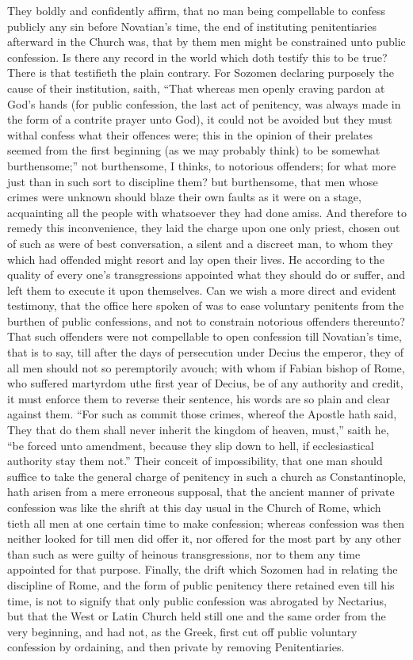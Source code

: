They boldly and confidently affirm, that no man being compellable to confess publicly any sin before Novatian’s time, the end of instituting penitentiaries afterward in the Church was, that by them men might be constrained unto public confession. Is there any record in the world which doth testify this to be true? There is that testifieth the plain contrary. For Sozomen  declaring purposely the cause of their institution, saith, “That whereas men openly craving pardon at God’s hands (for public confession, the last act of penitency, was always made in the form of a contrite prayer unto God), it could not be avoided but they must withal confess what their offences were; this in the opinion of their prelates seemed from the first beginning (as we may probably think) to be somewhat burthensome;” not burthensome, I thinks, to notorious offenders; for what more just than in such sort to discipline them? but burthensome, that men whose crimes were unknown should blaze their own faults as it were on a stage, acquainting all the people with whatsoever they had done amiss. And therefore to remedy this inconvenience, they laid the charge upon one only priest, chosen out of such as were of best conversation, a silent and a discreet man, to whom they which had offended might resort and lay open their lives. He according to the quality of every one’s transgressions appointed what they should do or suffer, and left them to execute it upon themselves. Can we wish a more direct and evident testimony, that the office here spoken of was to ease voluntary penitents from the burthen of public confessions, and not to constrain notorious offenders thereunto? That such offenders were not compellable to open confession till Novatian’s time, that is to say, till after the days of persecution under Decius the emperor, they of all men should not so peremptorily avouch; with whom if Fabian bishop of Rome, who suffered martyrdom uthe first year of Decius, be of any authority and credit, it must enforce them to reverse their sentence, his words are so plain and clear against them. “For such as commit those crimes, whereof the Apostle hath said, They that do them shall never inherit the kingdom of heaven,  must,” saith he, “be forced unto amendment, because they slip down to hell, if ecclesiastical authority stay them not.” Their conceit of impossibility, that one man should suffice to take the general charge of penitency in such a church as Constantinople, hath arisen from a mere erroneous supposal, that the ancient manner of private confession was like the shrift at this day usual in the Church of Rome, which tieth all men at one certain time to make confession; whereas confession was then neither looked for till men did offer it, nor offered for the most part by any other than such as were guilty of heinous transgressions, nor to them any time appointed for that purpose. Finally, the drift which Sozomen had in relating the discipline of Rome, and the form of public penitency there retained even till his time, is not to signify that only public confession was abrogated by Nectarius, but that the West or Latin Church held still one and the same order from the very beginning, and had not, as the Greek, first cut off public voluntary confession by ordaining, and then private by removing Penitentiaries.

